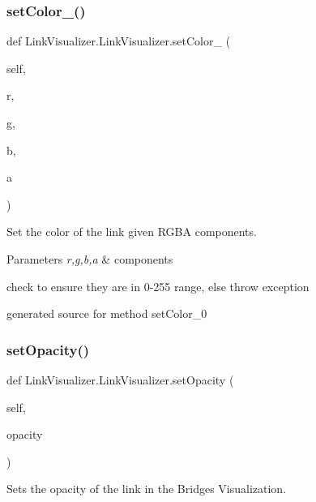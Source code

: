 \subsubsection{\texorpdfstring{set\+Color\+\_()}{setColor\_0()}}
{\footnotesize\ttfamily def Link\+Visualizer.\+Link\+Visualizer.\+set\+Color\+\_ (\begin{DoxyParamCaption}\item[{}]{self,  }\item[{}]{r,  }\item[{}]{g,  }\item[{}]{b,  }\item[{}]{a }\end{DoxyParamCaption})}



Set the color of the link given R\+G\+BA components. 


\begin{DoxyParams}{Parameters}
{\em r,g,b,a} & components\\
\hline
\end{DoxyParams}
check to ensure they are in 0-\/255 range, else throw exception\begin{DoxyVerb}generated source for method setColor_0 \end{DoxyVerb}
 \hypertarget{class_link_visualizer_1_1_link_visualizer_ab423f6b361fe8725e12b06ab2ef1658f}{}\label{class_link_visualizer_1_1_link_visualizer_ab423f6b361fe8725e12b06ab2ef1658f} 
\subsubsection{\texorpdfstring{set\+Opacity()}{setOpacity()}}
{\footnotesize\ttfamily def Link\+Visualizer.\+Link\+Visualizer.\+set\+Opacity (\begin{DoxyParamCaption}\item[{}]{self,  }\item[{}]{opacity }\end{DoxyParamCaption})}



Sets the opacity of the link in the Bridges Visualization. 


